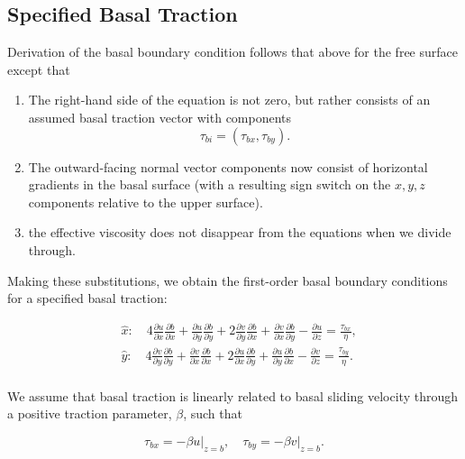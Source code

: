 \subsection{Specified Basal Traction}
Derivation of the basal boundary condition follows that above for the free surface except that
\begin{enumerate}

\item The right-hand side of the equation is not zero, but rather consists of an assumed basal traction vector with components 
\begin{equation}
\tau_{bi} = \left( \tau _{bx},\tau _{by} \right).
\end{equation}

\item The outward-facing normal vector components now consist of horizontal gradients in the basal surface (with a resulting sign switch on the $x,y,z$ components relative to the upper surface).

\item the effective viscosity does not disappear from the equations when we divide through.
\end{enumerate}

Making these substitutions, we obtain the first-order basal boundary conditions for a specified basal traction:

\begin{equation}
\label{ho.eq.basal_bc}
\begin{split}
  & \hat{x}:\quad 4\frac{\partial u}{\partial x}\frac{\partial b}{\partial x}+\frac{\partial u}{\partial y}\frac{\partial b}{\partial y}+2\frac{\partial v}{\partial y}\frac{\partial b}{\partial x}+\frac{\partial v}{\partial x}\frac{\partial b}{\partial y}-\frac{\partial u}{\partial z}=\frac{\tau _{bx}}{\eta }, \\ 
 & \hat{y}:\quad 4\frac{\partial v}{\partial y}\frac{\partial b}{\partial y}+\frac{\partial v}{\partial x}\frac{\partial b}{\partial x}+2\frac{\partial u}{\partial x}\frac{\partial b}{\partial y}+\frac{\partial u}{\partial y}\frac{\partial b}{\partial x}-\frac{\partial v}{\partial z}=\frac{\tau _{by}}{\eta }. \\
\end{split}
 \end{equation}

\noindent
We assume that basal traction is linearly related to basal sliding velocity through a positive traction parameter, $\beta$, such that

\begin{equation}
\label{ho.eq.basaltraction}
\tau _{bx}=\left. -\beta u \right|_{z=b},\quad \tau _{by}=\left. -\beta v \right|_{z=b}.
\end{equation}

